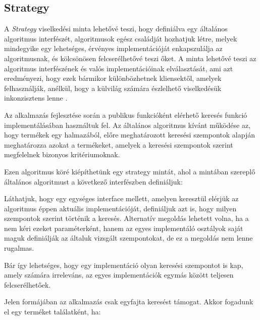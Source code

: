 \subsection{Strategy}

A \emph{Strategy} viselkedési minta lehetővé teszi, hogy definiálva egy általános algoritmus interfészét, algoritmusok egész családját hozhatjuk létre, melyek mindegyike egy lehetséges, érvényes implementációját enkapszulálja az algoritmusnak, és kölcsönösen felcserélhetővé teszi őket. A minta lehetővé teszi az algoritmus interfészének és valós implementációinak elválasztását, ami azt eredményezi, hogy ezek bármikor különbözhetnek kliensektől, amelyek felhasználják, anélkül, hogy a külvilág számára észlelhető viselkedésük inkonzisztens lenne \cite{gamma1995elements}. \par


Az alkalmazás fejlesztése során a publikus funkcióként elérhető keresés funkció implementálásában használtuk fel. Az általános algoritmus kívánt működése az, hogy termékek egy halmazából, előre meghatározott keresési szempontok alapján meghatározza azokat a termékeket, amelyek a keresési szempontok szerint megfelelnek bizonyos kritériumoknak. \par

Ezen algoritmus köré kiépíthetünk egy strategy mintát, ahol a mintában szereplő általános algoritmust a következő interfészben definiáljuk: 


Láthatjuk, hogy egy egységes interface mellett, amelyen keresztül elérjük az algoritmus éppen aktuális implementációját, definiáljuk azt is, hogy milyen szempontok szerint történik a keresés. Alternatív megoldás lehetett volna, ha a  nem kéri ezeket paraméterként, hanem az egyes implementáló osztályok saját maguk definiálják az általuk vizsgált szempontokat, de ez a megoldás nem lenne rugalmas. \par

 Bár így lehetséges, hogy egy implementáció olyan keresési szempontot is kap, amely számára irreleváns, az egyes implementációk egymás között teljesen felcserélhetőek. \par
 
 Jelen formájában az alkalmazás csak egyfajta keresést támogat. Akkor fogadunk el egy terméket találatként, ha:
 
